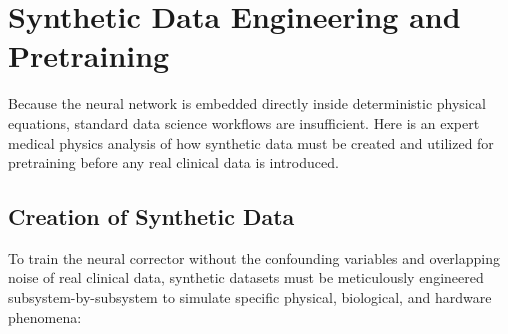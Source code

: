 \documentclass[11pt,a4paper]{article}
\begin{document}
\section{Synthetic Data Engineering and Pretraining}

Because the neural network is embedded directly inside deterministic physical equations, standard data science workflows are insufficient. Here is an expert medical physics analysis of how synthetic data must be created and utilized for pretraining before any real clinical data is introduced.

\subsection{Creation of Synthetic Data}
To train the neural corrector without the confounding variables and overlapping noise of real clinical data, synthetic datasets must be meticulously engineered subsystem-by-subsystem to simulate specific physical, biological, and hardware phenomena:
\end{document}
